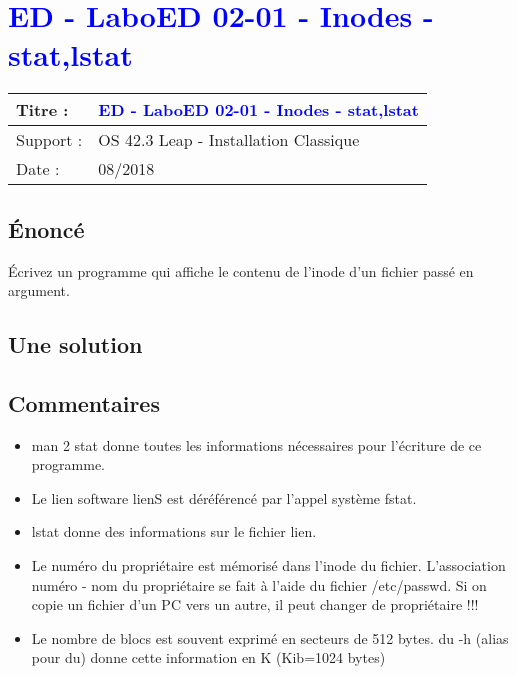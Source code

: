 \lstset{language=c}
\renewcommand{\titre}{\textcolor{blue}{ ED - LaboED 02-01 - Inodes - stat,lstat}}

\lhead{ \titre }
\section{{\titre} }

\begin{tabular}{|l|l|}
\hline
Titre : 	& \titre \\\hline
Support : 	& OS 42.3 Leap - Installation Classique \\\hline
Date :		& 08/2018 \\\hline
\end{tabular}

\subsection{Énoncé}

Écrivez un programme qui affiche le contenu de l'inode d'un fichier passé en argument.

\subsection{Une solution}



\subsection{Commentaires}

\begin{itemize}
\item man 2 stat donne toutes les informations nécessaires pour l'écriture de ce programme.
\item Le lien software lienS est déréférencé par l'appel système fstat.
\item lstat donne des informations sur le fichier lien.
\item Le numéro du propriétaire est mémorisé dans l'inode du fichier. L'association numéro - nom du propriétaire se fait à l'aide du fichier /etc/passwd. Si on copie un fichier d'un PC vers un autre, il peut changer de propriétaire !!!
\item Le nombre de blocs est souvent exprimé en secteurs de 512 bytes. du -h (alias pour du) donne cette information en K (Kib=1024 bytes)
\end{itemize}

